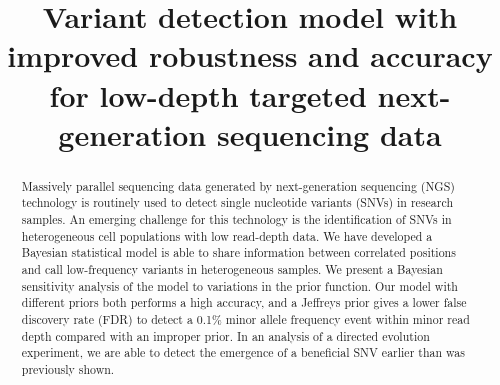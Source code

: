 \documentclass[11pt,reqno]{amsart}
\title[RVD3]{Variant detection model with improved robustness and accuracy for low-depth targeted next-generation sequencing data}
\author{}
\begin{document}
\begin{abstract}


Massively parallel sequencing data generated by next-generation sequencing (NGS) technology is routinely used to detect single nucleotide variants (SNVs) in research samples.
An emerging challenge for this technology is the identification of SNVs in heterogeneous cell populations with low read-depth data.
We have developed a Bayesian statistical model is able to share information between correlated positions and call low-frequency variants in heterogeneous samples.
We present a Bayesian sensitivity analysis of the model to variations in the prior function.
Our model with different priors both performs a high accuracy, and a Jeffreys prior gives a lower false discovery rate (FDR) to detect a 0.1\% minor allele frequency event within minor read depth compared with an improper prior.
In an analysis of a directed evolution experiment, we are able to detect the emergence of a beneficial SNV earlier than was previously shown.

\end{abstract}
\end{document}
